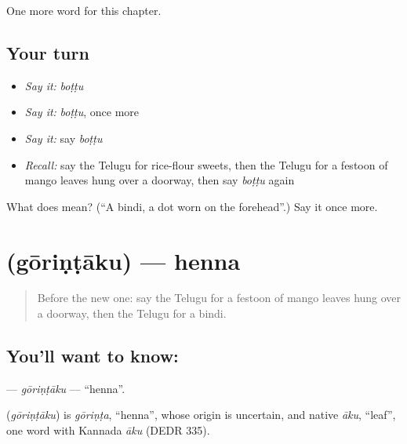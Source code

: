 \begin{grammarlens}[title={What you've built}]
One more word for this chapter.
\end{grammarlens}

\subsection*{Your turn}
\begin{itemize}
\raggedright
  \item \emph{Say it:} \emph{boṭṭu}
  \item \emph{Say it:} \emph{boṭṭu}, once more
  \item \emph{Say it:} say \emph{boṭṭu}
  \item \emph{Recall:} say the Telugu for rice-flour sweets, then the Telugu for a festoon of mango leaves hung over a doorway, then say \emph{boṭṭu} again
\end{itemize}

\begin{tcolorbox}[breakable,colback=teal!4,colframe=teal!35!black,title={Before you move on}]
What does  mean? (\textquotedblleft{}A bindi, a dot worn on the forehead\textquotedblright{}.) Say it once more.
\end{tcolorbox}
\section[\texorpdfstring{\te{గోరింటాకు} (gōriṇṭāku)}{గోరింటాకు (gōriṇṭāku)}]{ (gōriṇṭāku) — henna}

\label{lesson:TE-C188-gorintaku}



\begin{quote}
Before the new one: say the Telugu for a festoon of mango leaves hung over a doorway, then the Telugu for a bindi.
\end{quote}

\subsection*{You'll want to know: }
\textbf{} — \emph{gōriṇṭāku} — \textquotedblleft{}henna\textquotedblright{}.

\begin{cousinweb}
\textbf{} (\emph{gōriṇṭāku}) is \emph{gōriṇṭa}, \textquotedblleft{}henna\textquotedblright{}, whose origin is uncertain, and native \emph{āku}, \textquotedblleft{}leaf\textquotedblright{}, one word with Kannada \emph{āku} (DEDR 335).
\end{cousinweb}

